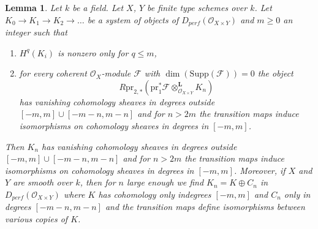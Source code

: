 \documentclass{stacks-project}
\theoremstyle{plain}
\newtheorem{lemma}[subsection]{Lemma}
\theoremstyle{definition}
\theoremstyle{remark}
\numberwithin{equation}{subsection}
\begin{document}
\begin{lemma}
\label{lemma-bounded-fibres}
Let $k$ be a field. Let $X$, $Y$ be finite type schemes over $k$.
Let $K_0 \to K_1 \to K_2 \to \ldots$ be a system of objects
of $D_{perf}(\mathcal{O}_{X \times Y})$ and $m \geq 0$ an integer such that
\begin{enumerate}
\item $H^q(K_i)$ is nonzero only for $q \leq m$,
\item for every coherent $\mathcal{O}_X$-module $\mathcal{F}$ with
$\dim(\text{Supp}(\mathcal{F})) = 0$ the object
$$
R\text{pr}_{2, *}(
\text{pr}_1^*\mathcal{F} \otimes_{\mathcal{O}_{X \times Y}}^\mathbf{L}
K_n)
$$
has vanishing cohomology sheaves in degrees outside
$[-m, m] \cup [-m - n, m - n]$ and for $n > 2m$ the transition maps
induce isomorphisms on cohomology sheaves in degrees in $[-m, m]$.
\end{enumerate}
Then $K_n$ has vanishing cohomology sheaves in degrees outside
$[-m, m] \cup [-m - n, m - n]$ and for $n > 2m$ the
transition maps induce isomorphisms on cohomology sheaves in degrees in
$[-m, m]$. Moreover, if $X$ and $Y$ are smooth over $k$, then for $n$
large enough we find $K_n = K \oplus C_n$ in
$D_{perf}(\mathcal{O}_{X \times Y})$
where $K$ has cohomology only indegrees $[-m, m]$ and $C_n$ only in
degrees $[-m - n, m - n]$ and the transition maps
define isomorphisms between various copies of $K$.
\end{lemma}
\end{document}
